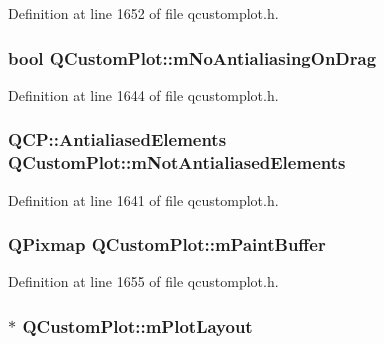 Definition at line 1652 of file qcustomplot.\-h.

\hypertarget{class_q_custom_plot_ac83df968435f6b8ec79f2993ab9124e8}{
\subsubsection[{m\-No\-Antialiasing\-On\-Drag}]{\setlength{\rightskip}{0pt plus 5cm}bool Q\-Custom\-Plot\-::m\-No\-Antialiasing\-On\-Drag\hspace{0.3cm}{\ttfamily [protected]}}}\label{class_q_custom_plot_ac83df968435f6b8ec79f2993ab9124e8}


Definition at line 1644 of file qcustomplot.\-h.

\hypertarget{class_q_custom_plot_a2b6ebcad00a90ba07f146cefcd4293da}{
\subsubsection[{m\-Not\-Antialiased\-Elements}]{\setlength{\rightskip}{0pt plus 5cm}Q\-C\-P\-::\-Antialiased\-Elements Q\-Custom\-Plot\-::m\-Not\-Antialiased\-Elements\hspace{0.3cm}{\ttfamily [protected]}}}\label{class_q_custom_plot_a2b6ebcad00a90ba07f146cefcd4293da}


Definition at line 1641 of file qcustomplot.\-h.

\hypertarget{class_q_custom_plot_a753630df96e0672098d9e88bd41d1913}{
\subsubsection[{m\-Paint\-Buffer}]{\setlength{\rightskip}{0pt plus 5cm}Q\-Pixmap Q\-Custom\-Plot\-::m\-Paint\-Buffer\hspace{0.3cm}{\ttfamily [protected]}}}\label{class_q_custom_plot_a753630df96e0672098d9e88bd41d1913}


Definition at line 1655 of file qcustomplot.\-h.

\hypertarget{class_q_custom_plot_ac97298756882a0eecd98151679850ac1}{
\subsubsection[{m\-Plot\-Layout}]{$\ast$ Q\-Custom\-Plot\-::m\-Plot\-Layout\hspace{0.3cm}{\ttfamily [protected]}}}\label{class_q_custom_plot_ac97298756882a0eecd98151679850ac1}


